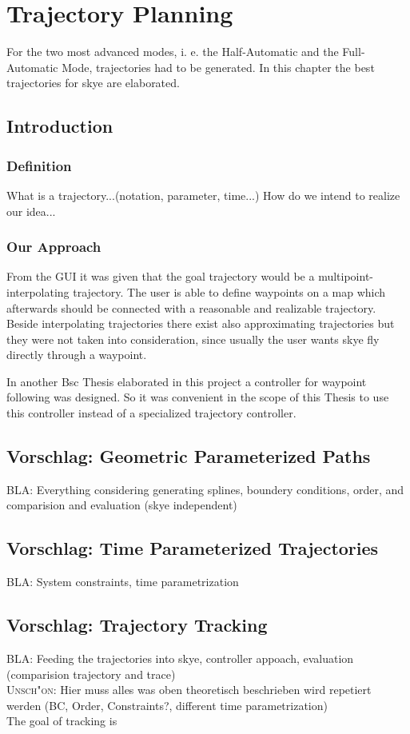 \chapter{Trajectory Planning}
\label{cha:trajectory}
For the two most advanced modes, i. e. the Half-Automatic and the Full-Automatic Mode, trajectories had to be generated. In this chapter the best trajectories for skye are elaborated.

\section{Introduction}

\subsection{Definition}
What is a trajectory...(notation, parameter, time...)
How do we intend to realize our idea... 

\subsection{Our Approach}
From the GUI it was given that the goal trajectory would be a multipoint-interpolating trajectory. The user is able to define waypoints on a map which afterwards should be connected with a reasonable and realizable trajectory. Beside interpolating trajectories there exist also approximating trajectories but they were not taken into consideration, since usually the user wants skye fly directly through a waypoint.

In another Bsc Thesis elaborated in this project a controller for waypoint following was designed. So it was convenient in the scope of this Thesis to use this controller instead of a specialized trajectory controller.

\section{Vorschlag: Geometric Parameterized Paths}
BLA: Everything considering generating splines, boundery conditions, order, and comparision and evaluation (skye independent)
\section{Vorschlag: Time Parameterized Trajectories}
BLA: System constraints, time parametrization
\section{Vorschlag: Trajectory Tracking}
BLA: Feeding the trajectories into skye, controller appoach, evaluation (comparision trajectory and trace) \\
\textsc{Unsch"on:} Hier muss alles was oben theoretisch beschrieben wird repetiert werden (BC, Order, Constraints?, different time parametrization) \\
The goal of tracking is


